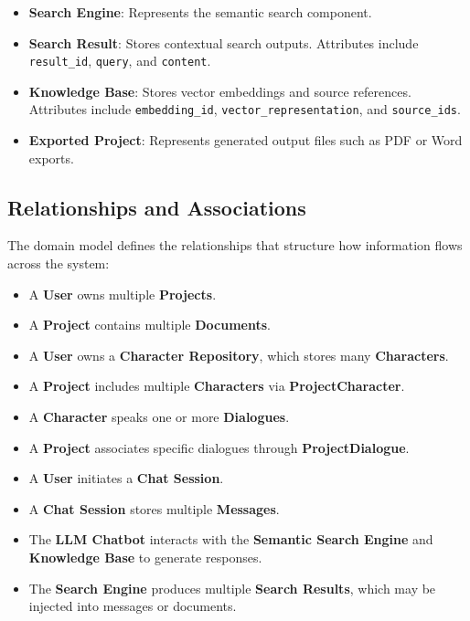 \begin{itemize}
    \item \textbf{Search Engine}: Represents the semantic search component.
    
    \item \textbf{Search Result}: Stores contextual search outputs. Attributes include \texttt{result\_id}, \texttt{query}, and \texttt{content}.
    
    \item \textbf{Knowledge Base}: Stores vector embeddings and source references. Attributes include \texttt{embedding\_id}, \texttt{vector\_representation}, and \texttt{source\_ids}.
    
    \item \textbf{Exported Project}: Represents generated output files such as PDF or Word exports.
\end{itemize}

\subsection{Relationships and Associations}

The domain model defines the relationships that structure how information flows across the system:

\begin{itemize}
    \item A \textbf{User} owns multiple \textbf{Projects}.
    \item A \textbf{Project} contains multiple \textbf{Documents}.
    \item A \textbf{User} owns a \textbf{Character Repository}, which stores many \textbf{Characters}.
    \item A \textbf{Project} includes multiple \textbf{Characters} via \textbf{ProjectCharacter}.
    \item A \textbf{Character} speaks one or more \textbf{Dialogues}.
    \item A \textbf{Project} associates specific dialogues through \textbf{ProjectDialogue}.
    \item A \textbf{User} initiates a \textbf{Chat Session}.
    \item A \textbf{Chat Session} stores multiple \textbf{Messages}.
    \item The \textbf{LLM Chatbot} interacts with the \textbf{Semantic Search Engine} and \textbf{Knowledge Base} to generate responses.
    \item The \textbf{Search Engine} produces multiple \textbf{Search Results}, which may be injected into messages or documents.
\end{itemize}

